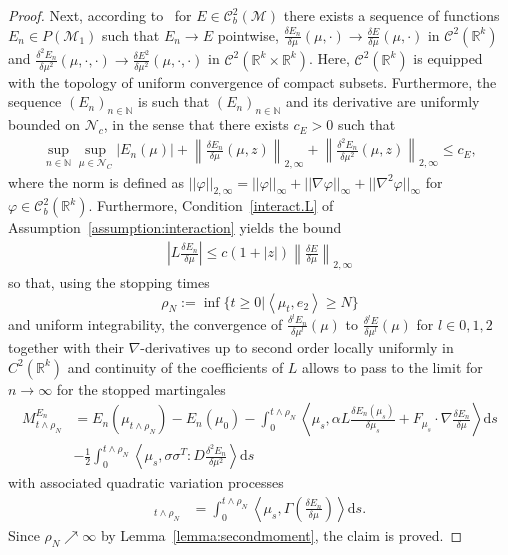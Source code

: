 \documentclass{article}
\newcommand{\dd}{\text{d}}
\newcommand{\av}[1]{\left<#1\right>}
\newcommand{\R}{\mathbb{R}}
\newcommand{\N}{\mathbb{N}}
\newcommand{\C}{\mathcal C}
\newcommand{\cN}{\mathcal N}
\begin{document}
\begin{proof}
 Next, according to~\cite[Theorem 5]{Konarovskyi2020a} for $E \in \C_b^2(\mathcal M)$ there exists a
 sequence of functions $E_n \in P(\mathcal M_1)$ such that $E_n \to E$ pointwise,
 $\frac{\delta E_n}{\delta \mu}(\mu, \cdot) \to \frac{\delta E}{\delta \mu}(\mu, \cdot) $ in $\C^2(\R^k)$ and
 $\frac{\delta^2 E_n}{\delta \mu^2}(\mu, \cdot, \cdot) \to \frac{\delta E^2}{\delta \mu^2}(\mu, \cdot, \cdot)$
 in $\C^2(\R^k \times \R^k)$. Here, $\C^2(\R^k)$ is equipped with the topology of uniform convergence of
 compact subsets.  Furthermore, the sequence $(E_n)_{n \in \N}$ is such that $(E_n)_{n \in \N}$ and its
 derivative are uniformly bounded on $\cN_c$, in the sense that there exists $c_E >0$ such that
\begin{align}
  \sup_{n \in \N}\sup_{\mu \in \cN_C}| E_n(\mu) | + \left\|\frac{\delta E_n}{\delta \mu}(\mu, z) \right\|_{2,\infty} + \left\|\frac{\delta^2 E_n}{\delta \mu^2}(\mu, z) \right\|_{2,\infty}\leq c_E,
  \label{eqn:bound}
\end{align}
where the norm is defined as
$||\varphi||_{2,\infty} = ||\varphi||_\infty + ||\nabla \varphi||_\infty + ||\nabla^2 \varphi||_\infty $ for
$\varphi \in \C^2_b(\R^k)$.
Furthermore, Condition~\ref{interact.L} of Assumption~\ref{assumption:interaction} yields the bound 
\begin{align*}
        \left|L \frac{\delta E_n}{\delta \mu}\right| \leq c (1+ |z|) \left\| \frac{\delta E}{\delta \mu}\right\|_{2,\infty}
\end{align*}
so that, using the stopping times
\[\rho_N := \inf\{t \geq 0| \av{\mu_t, e_2} \geq N \}\]
and uniform integrability, the convergence of $\frac{\delta^{l} E_n}{\delta \mu^l}(\mu)$ to
$\frac{\delta^{l} E}{\delta \mu^l}(\mu)$ for $l\in {0,1,2}$ together with their $\nabla$-derivatives up to
second order locally uniformly in $C^2(\R^k)$ and continuity of the coefficients of $L$ allows to pass to the
limit for $n \to \infty$ for the stopped martingales
\begin{align*}
  M_{t\wedge\rho_N}^{E_n} &=  {E_n}(\mu_{t\wedge\rho_N}) - {E_n}(\mu_0) - \int_0^{t\wedge\rho_N} \av{\mu_s, \alpha L \frac{\delta {E_n}(\mu_s)}{\delta \mu_s} + F_{\mu_s} \cdot  \nabla \frac{\delta {E_n}}{\delta \mu} } \dd s\\
                          &- \frac{1}{2} \int_0^{t\wedge\rho_N} \av{\mu_s, \sigma \sigma^T:D  \frac{\delta^2 {E_n}}{\delta \mu^2}} \dd s
\end{align*}
with associated quadratic variation processes
\begin{align*}
  [M^{E_n}_\cdot]_{t\wedge \rho_N} &=  \int_0^{t\wedge \rho_N} \av{\mu_s, \Gamma\left( \frac{\delta E_n}{\delta \mu} \right)}\dd s.
\end{align*}
Since $\rho_N\nearrow \infty$ by Lemma~\ref{lemma:secondmoment}, the claim is proved.
\end{proof}
\end{document}

